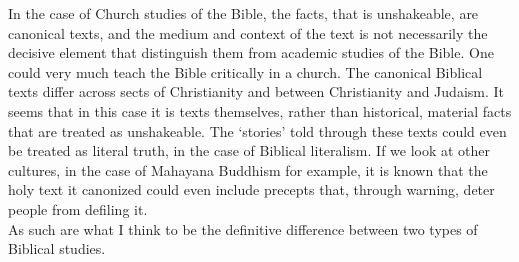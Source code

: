\documentclass[a4paper,12pt,]{article}
\begin{document}
In the case of Church studies of the Bible, the facts, that is unshakeable, are canonical texts, and the medium and context of the text is not necessarily the decisive element that distinguish them from academic studies of the Bible. One could very much teach the Bible \autocite[Chapter 3]{Collins} critically in a church. The canonical Biblical texts differ across sects of Christianity and between Christianity and Judaism. It seems that in this case it is texts themselves, rather than historical, material facts that are treated as unshakeable. The `stories' told through these texts could even be treated as literal truth, in the case of Biblical literalism. If we look at other cultures, in the case of Mahayana Buddhism for example, it is known that the holy text it canonized could even include precepts that, through warning, deter people from defiling it.
\\ As such are what I think to be the definitive difference between two types of Biblical studies.

\printbibliography
\end{document}
